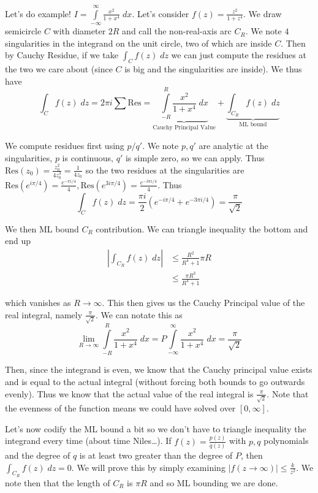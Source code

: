 \documentclass[10pt]{report}
\newcommand{\abs}[1]{\left|#1\right|}
\newcommand{\Res}[0]{\mathrm{Res} }
\begin{document}
Let's do example! $I = \displaystyle\int\limits_{-\infty}^{\infty}\frac{x^2}{1+x^4}\;dx$. Let's consider $f(z) = \frac{z^2}{1+z^4}$. We draw semicircle $C$ with diameter $2R$ and call the non-real-axis arc $C_R$. We note $4$ singularities in the integrand on the unit circle, two of which are inside $C$. Then by Cauchy Residue, if we take $\int_C f(z)\; dz$ we can just compute the residues at the two we care about (since $C$ is big and the singularities are inside). We thus have
$$\int_C f(z) \; dz = 2\pi i \sum \Res = \underbrace{\displaystyle\int\limits_{-R}^{R}\frac{x^2}{1+x^4}\;dx}_{\text{Cauchy Principal Value}} + \underbrace{\int_{C_R} f(z)\; dz}_{\text{ML bound}}$$

We compute residues first using $p/q'$. We note $p,q'$ are analytic at the singularities, $p$ is continuous, $q'$ is simple zero, so we can apply. Thus $\Res(z_0) = \frac{z_0^2}{4z_0^3} = \frac{1}{4z_0}$ so the two residues at the singularities are $\Res(e^{i\pi/4}) = \frac{e^{-\pi i/4}}{4}, \Res(e^{3i\pi/4}) = \frac{e^{-3\pi i/4}}{4}$. Thus
$$\int_C f(z)\; dz = \frac{\pi i}{2}\left( e^{-i\pi/4} + e^{-3\pi i/4} \right) = \frac{\pi}{\sqrt{2}}$$

We then ML bound $C_R$ contribution. We can triangle inequality the bottom and end up
\begin{align*}
    \abs{\int_{C_R}f(z)\; dz} &\leq \frac{R^2}{R^4 + 1} \pi R\\
    & \leq \frac{ \pi R^3}{R^4 + 1}
\end{align*}

which vanishes as $R \to \infty$. This then gives us the Cauchy Principal value of the real integral, namely $\frac{\pi}{\sqrt{2}}$. We can notate this as
$$\lim_{R \to \infty} \displaystyle\int\limits_{-R}^{R}\frac{x^2}{1+x^4}\;dx = P\displaystyle\int\limits_{-\infty}^{\infty}\frac{x^2}{1+x^4}\;dx = \frac{\pi}{\sqrt{2}}$$

Then, since the integrand is even, we know that the Cauchy principal value exists and is equal to the actual integral (without forcing both bounds to go outwards evenly). Thus we know that the actual value of the real integral is $\frac{\pi}{\sqrt{2}}$. Note that the evenness of the function means we could have solved over $[0,\infty]$. 

Let's now codify the ML bound a bit so we don't have to triangle inequality the integrand every time (about time Niles\dots). If $f(z) = \frac{p(z)}{q(z)}$ with $p,q$ polynomials and the degree of $q$ is at least two greater than the degree of $P$, then $\int_{C_R}f(z) \; dz = 0$. We will prove this by simply examining $\abs{f(z \to \infty)} \leq \frac{k}{z^2}$. We note then that the length of $C_R$ is $\pi R$ and so ML bounding we are done. 
\end{document}
